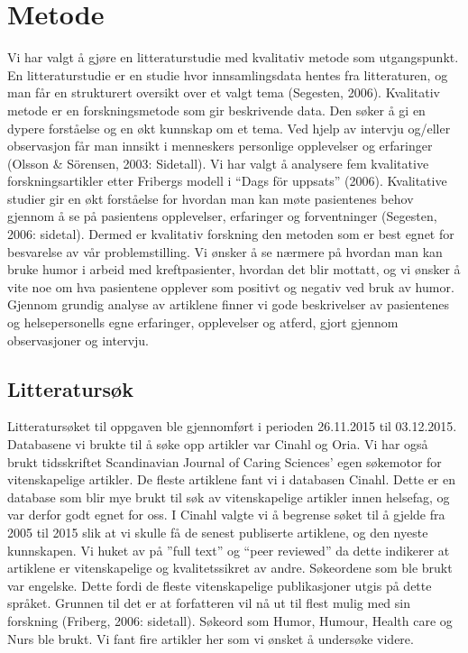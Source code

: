 \chapter{Metode}

Vi har valgt å gjøre en litteraturstudie med kvalitativ metode som
utgangspunkt. En litteraturstudie er en studie hvor innsamlingsdata hentes fra
litteraturen, og man får en strukturert oversikt over et valgt tema (Segesten,
2006). Kvalitativ metode er en forskningsmetode som gir beskrivende data. Den
søker å gi en dypere forståelse og en økt kunnskap om et tema. Ved hjelp av
intervju og/eller observasjon får man innsikt i menneskers personlige
opplevelser og erfaringer (Olsson \&{} Sörensen, 2003: Sidetall). Vi har valgt å
analysere fem kvalitative forskningsartikler etter Fribergs modell i “Dags för
uppsats” (2006). Kvalitative studier gir en økt forståelse for hvordan man kan
møte pasientenes behov gjennom å se på pasientens opplevelser, erfaringer og
forventninger (Segesten, 2006: sidetal). Dermed er kvalitativ forskning den
metoden som er best egnet for besvarelse av vår problemstilling.  Vi ønsker å
se nærmere på hvordan man kan bruke humor i arbeid med kreftpasienter, hvordan
det blir mottatt, og vi ønsker å vite noe om hva pasientene opplever som
positivt og negativ ved bruk av humor. Gjennom grundig analyse av artiklene
finner vi gode beskrivelser av pasientenes og helsepersonells egne erfaringer,
opplevelser og atferd, gjort gjennom observasjoner og intervju.

\section{Litteratursøk}

Litteratursøket til oppgaven ble gjennomført i perioden 26.11.2015 til
03.12.2015. Databasene vi brukte til å søke opp artikler var Cinahl og Oria. Vi
har også brukt tidsskriftet Scandinavian Journal of Caring Sciences’ egen
søkemotor for vitenskapelige artikler. De fleste artiklene fant vi i databasen
Cinahl. Dette er en database som blir mye brukt til søk av vitenskapelige
artikler innen helsefag, og var derfor godt egnet for oss.  I Cinahl valgte vi
å begrense søket til å gjelde fra 2005 til 2015 slik at vi skulle få de senest
publiserte artiklene, og den nyeste kunnskapen. Vi huket av på ”full text” og
“peer reviewed” da dette indikerer at artiklene er vitenskapelige og
kvalitetssikret av andre. Søkeordene som ble brukt var engelske. Dette fordi de
fleste vitenskapelige publikasjoner utgis på dette språket. Grunnen til det er
at forfatteren vil nå ut til flest mulig med sin forskning (Friberg, 2006:
sidetall). Søkeord som Humor, Humour, Health care og Nurs ble brukt. Vi fant
fire artikler her som vi ønsket å undersøke videre.

